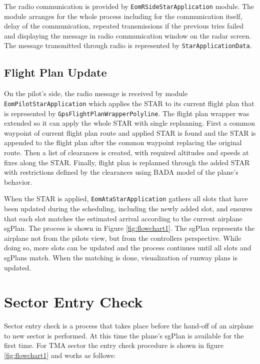 The radio communication is provided by \texttt{EomRSideStarApplication} module. The module arranges for the whole process including for the communication itself, delay of the communication, repeated transmissions if the previous tries failed and displaying the message in radio communication window on the radar screen. The message transmitted through radio is represented by \texttt{StarApplicationData}.

\subsection{Flight Plan Update}

On the pilot's side, the radio message is received by module \texttt{EomPilotStarApplication} which applies the STAR to its current flight plan that is represented by \texttt{GpsFlightPlan\-WrapperPolyline}. The flight plan wrapper was extended so it can apply the whole STAR with single replanning. First a common waypoint of current flight plan route and applied STAR is found and the STAR is appended to the flight plan after the common waypoint replacing the original route. Then a list of clearances is created, with required altitudes and speeds at fixes along the STAR. Finally, flight plan is replanned  through the added STAR with restrictions defined by the clearances using BADA model of the plane's behavior.

When the STAR is applied, \texttt{EomAtaStarApplication} gathers all slots that have been updated during the scheduling, including the newly added slot, and ensures that each slot matches the estimated arrival according to the current airplane sgPlan. The process is shown in Figure \ref{fig:flowchart1}. The sgPlan represents the airplane not from the pilots view, but from the controllers perspective. While doing so, more slots can be updated and the process continues until all slots and sgPlans match. When the matching is done, visualization of runway plans is updated.

\section{Sector Entry Check}

Sector entry check is a process that takes place before the hand-off of an airplane to new sector is performed. At this time the plane's sgPlan is available for the first time. For TMA sector the entry check procedure is shown in figure \ref{fig:flowchart1} and works as follows:

